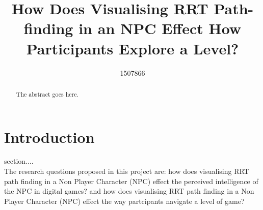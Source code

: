 \documentclass[journal]{IEEEtran}
\begin{document}
%
\title{ How Does Visualising RRT Path-finding in an NPC Effect How Participants Explore a Level?}
%
%
\author{1507866}


\maketitle

\begin{abstract}
The abstract goes here.
\end{abstract}

\section{Introduction}
% 
% 
% 
% 
 section.... \\
The research questions proposed in this project are: how does visualising RRT path finding in a Non Player Character (NPC) effect the perceived intelligence of the NPC in digital games? and how does visualising RRT path finding in a Non Player Character (NPC) effect the way partcipants navigate a level of game? 
\end{document}
